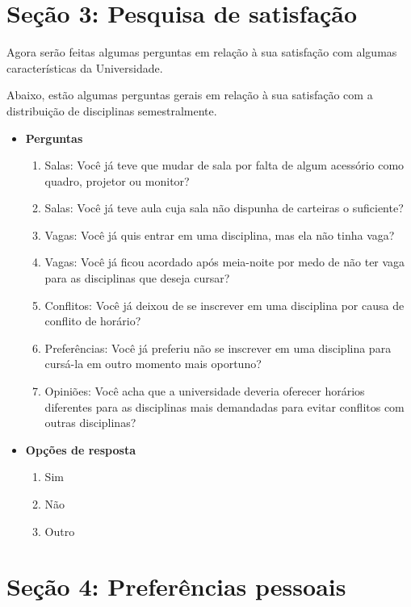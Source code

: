 \begin{apendicesenv}
  \section*{Seção 3: Pesquisa de satisfação}

  Agora serão feitas algumas perguntas em relação à sua satisfação com algumas características da Universidade.

  Abaixo, estão algumas perguntas gerais em relação à sua satisfação com a distribuição de disciplinas semestralmente.

  \begin{itemize}
    \item \textbf{Perguntas}
          \begin{enumerate}
            \item Salas: Você já teve que mudar de sala por falta de algum acessório como quadro, projetor ou monitor?
            \item Salas: Você já teve aula cuja sala não dispunha de carteiras o suficiente?
            \item Vagas: Você já quis entrar em uma disciplina, mas ela não tinha vaga?
            \item Vagas: Você já ficou acordado após meia-noite por medo de não ter vaga para as disciplinas que deseja cursar?
            \item Conflitos: Você já deixou de se inscrever em uma disciplina por causa de conflito de horário?
            \item Preferências: Você já preferiu não se inscrever em uma disciplina para cursá-la em outro momento mais oportuno?
            \item Opiniões: Você acha que a universidade deveria oferecer horários diferentes para as disciplinas mais demandadas para evitar conflitos com outras disciplinas?
          \end{enumerate}
    \item \textbf{Opções de resposta}
          \begin{enumerate}
            \item Sim
            \item Não
            \item Outro
          \end{enumerate}
  \end{itemize}

  \section*{Seção 4: Preferências pessoais}


\end{apendicesenv}
